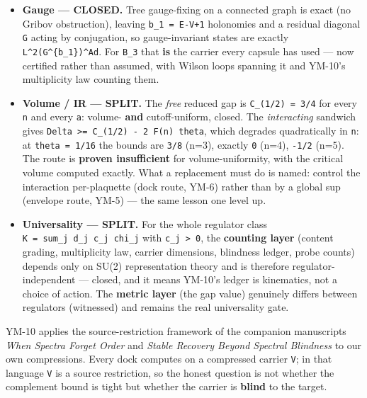 \begin{itemize}
\tightlist
\item
  \textbf{Gauge --- CLOSED.} Tree gauge-fixing on a connected graph is exact (no
  Gribov obstruction), leaving \texttt{b\_1\ =\ E-V+1} holonomies and a residual
  diagonal \texttt{G} acting by conjugation, so gauge-invariant states are
  exactly \texttt{L\^{}2(G\^{}\{b\_1\})\^{}Ad}. For \texttt{B\_3} that \textbf{is} the carrier every
  capsule has used --- now certified rather than assumed, with Wilson loops
  spanning it and YM-10's multiplicity law counting them.
\item
  \textbf{Volume / IR --- SPLIT.} The \emph{free} reduced gap is \texttt{C\_(1/2)\ =\ 3/4} for
  every \texttt{n} and every \texttt{a}: volume- \textbf{and} cutoff-uniform, closed. The
  \emph{interacting} sandwich gives \texttt{Delta\ \textgreater{}=\ C\_(1/2)\ -\ 2\ F(n)\ theta}, which
  degrades quadratically in \texttt{n}: at \texttt{theta\ =\ 1/16} the bounds are \texttt{3/8}
  (n=3), exactly \texttt{0} (n=4), \texttt{-1/2} (n=5). The route is \textbf{proven
  insufficient} for volume-uniformity, with the critical volume computed
  exactly. What a replacement must do is named: control the interaction
  per-plaquette (dock route, YM-6) rather than by a global sup (envelope
  route, YM-5) --- the same lesson one level up.
\item
  \textbf{Universality --- SPLIT.} For the whole regulator class
  \texttt{K\ =\ sum\_j\ d\_j\ c\_j\ chi\_j} with \texttt{c\_j\ \textgreater{}\ 0}, the \textbf{counting layer}
  (content grading, multiplicity law, carrier dimensions, blindness
  ledger, probe counts) depends only on SU(2) representation theory and
  is therefore regulator-independent --- closed, and it means YM-10's
  ledger is kinematics, not a choice of action. The \textbf{metric layer} (the
  gap value) genuinely differs between regulators (witnessed) and remains
  the real universality gate.
\end{itemize}

YM-10 applies the source-restriction framework of the companion
manuscripts \emph{When Spectra Forget Order} and \emph{Stable Recovery Beyond
Spectral Blindness} to our own compressions. Every dock computes on a
compressed carrier \texttt{V}; in that language \texttt{V} is a source restriction, so
the honest question is not whether the complement bound is tight but
whether the carrier is \textbf{blind} to the target.


